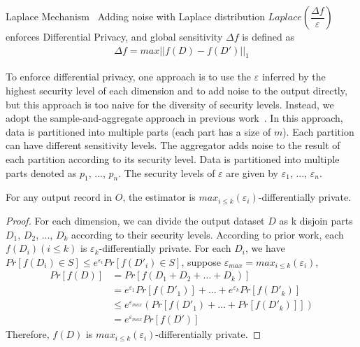 

\begin{theorem}{Laplace Mechanism~\cite{Dwork2006Differential}}
  Adding noise with Laplace distribution $Laplace(\dfrac{\Delta 
f}{\varepsilon})$ enforces
  Differential Privacy, and global sensitivity $\Delta f$ is defined as
  \vspace{-.1in}
  \begin{align}
    \Delta f = max || f(D) - f(D') ||_1
  \end{align}
\end{theorem}

To enforce differential privacy, one approach is to use the $\varepsilon$ 
inferred by the highest security level of each dimension and to add noise to 
the output directly, but this approach is too naive for the diversity of 
security levels. Instead, we adopt the sample-and-aggregate approach in 
previous work~\cite{differentialdp:stoc11}. In this approach, data is 
partitioned into multiple parts (each part has a size of $m$). Each partition 
can have different sensitivity levels. The aggregator adds noise to the 
result of each partition according to its security level. Data 
is partitioned into multiple parts denoted as $p_1$, ..., $p_n$.
The security levels of $\varepsilon$ are given by $\varepsilon_1$,
..., $\varepsilon_n$.

\begin{theorem}
  For any output record in $O$, the
  estimator is $max_{i \le k}(\varepsilon_i)$-differentially private.
\end{theorem}
\begin{proof}
  For each dimension, we can divide the output dataset $D$ as k disjoin parts 
$D_1$, $D_2$,
  ..., $D_k$ according to their security levels. According to 
prior work\cite{pointestimation:smith08},
  each $f(D_i)(i \le k)$ is $\varepsilon_k$-differentially private.
  For each $D_i$, we have $Pr[f(D_i) \in S] \le e^{\varepsilon_i}Pr[f(D'_i) \in 
S]$, suppose $\varepsilon_{max} = max_{i \le k}(\varepsilon_i)$, \\
  \vspace{-0.1in}
  \begin{equation} \label{eq1}
  \begin{split}
  Pr[f(D)] & = Pr[f(D_1 + D_2 + \ldots + D_k)] \\
   & = e^{\varepsilon_1}Pr[f(D'_1)] + \ldots + e^{\varepsilon_k}Pr[f(D'_k)] \\
   & \le  e^{\varepsilon_{max}}(Pr[f(D'_1) + \ldots + Pr[f(D'_k)]]) \\
   & = e^{\varepsilon_{max}}Pr[f(D')]
  \end{split}
  \end{equation}
  Therefore, $f(D)$ is $max_{i \le k}(\varepsilon_i)$-differentially private.
\end{proof}

